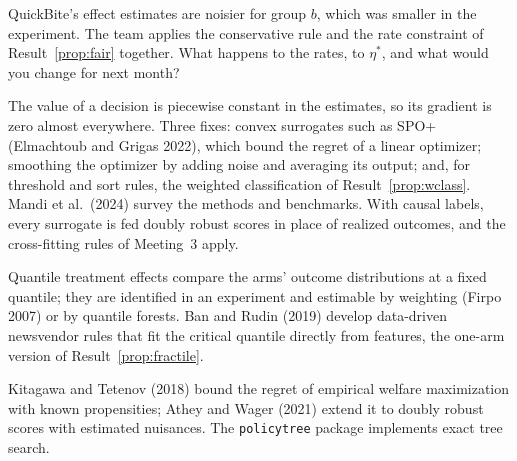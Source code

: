 \documentclass[11pt]{article}
\begin{document}
\begin{exercise}[judgment]
QuickBite's effect estimates are noisier for group $b$, which was smaller in the experiment. The team applies the conservative
rule and the rate constraint of Result~\ref{prop:fair} together. What happens to the rates, to $\eta^\ast$, and what would you change
for next month?
\end{exercise}

\sectionthree

\begin{extension}
The value of a decision is piecewise constant in the estimates, so its gradient is zero almost everywhere. Three fixes:
convex surrogates such as SPO+ (Elmachtoub and Grigas 2022), which bound the regret of a linear optimizer; smoothing the
optimizer by adding noise and averaging its output; and, for threshold and sort rules, the weighted classification of
Result~\ref{prop:wclass}. Mandi et al.\ (2024) survey the methods and benchmarks. With causal labels, every surrogate is fed
doubly robust scores in place of realized outcomes, and the cross-fitting rules of Meeting~3 apply.
\end{extension}

\begin{extension}
Quantile treatment effects compare the arms' outcome distributions at a fixed quantile; they are identified in an experiment
and estimable by weighting (Firpo 2007) or by quantile forests. Ban and Rudin (2019) develop data-driven newsvendor rules
that fit the critical quantile directly from features, the one-arm version of Result~\ref{prop:fractile}.
\end{extension}

\begin{extension}
Kitagawa and Tetenov (2018) bound the regret of empirical welfare maximization with known propensities; Athey and Wager (2021)
extend it to doubly robust scores with estimated nuisances. The \texttt{policytree} package implements exact tree search.
\end{extension}
\end{document}
